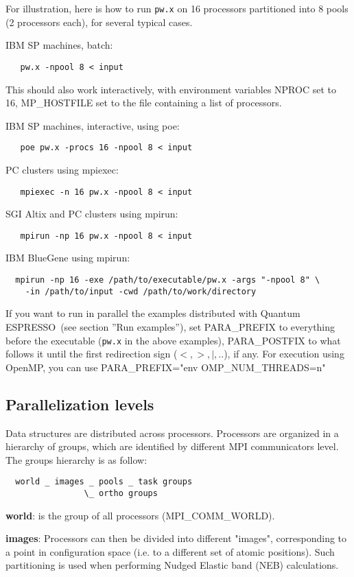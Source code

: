 \documentclass[12pt,a4paper]{article}
\def\qe{{\sc Quantum ESPRESSO}}
\def\pw.x{\texttt{pw.x}}
\begin{document}
For illustration, here is how to run \pw.x on 16 processors partitioned into
8 pools (2 processors each), for several typical cases. 

IBM SP machines, batch:
\begin{verbatim}
   pw.x -npool 8 < input
\end{verbatim}
This should also work interactively, with environment variables NPROC
set to 16, MP\_HOSTFILE set to the file containing a list of processors.

IBM SP machines, interactive, using poe:
\begin{verbatim}
   poe pw.x -procs 16 -npool 8 < input
\end{verbatim}
PC clusters using mpiexec:
\begin{verbatim}
   mpiexec -n 16 pw.x -npool 8 < input
\end{verbatim}
SGI Altix and PC clusters using mpirun:
\begin{verbatim}   mpirun -np 16 pw.x -npool 8 < input
\end{verbatim}
IBM BlueGene using mpirun:
 \begin{verbatim}
  mpirun -np 16 -exe /path/to/executable/pw.x -args "-npool 8" \
    -in /path/to/input -cwd /path/to/work/directory
\end{verbatim}
If you want to run in parallel the examples distributed with \qe\
(see section ''Run examples''), set PARA\_PREFIX to everything
before the executable (\pw.x in the above examples),
PARA\_POSTFIX to what follows it until the first redirection sign 
($<, >, |,..$), if any. For execution using OpenMP, you can
use PARA\_PREFIX="env OMP\_NUM\_THREADS=n"

\subsection{Parallelization levels}

Data structures are distributed across processors.
Processors are organized in a hierarchy of groups, 
which are identified by different MPI communicators level.
The groups hierarchy is as follow:
\begin{verbatim}
  world _ images _ pools _ task groups
                \_ ortho groups
\end{verbatim}

{\bf world}: is the group of all processors (MPI\_COMM\_WORLD).

{\bf images}: Processors can then be divided into different "images",
corresponding to a point in configuration space (i.e. to
a different set of atomic positions). Such partitioning 
is used when performing Nudged Elastic band (NEB) calculations.
\end{document}

